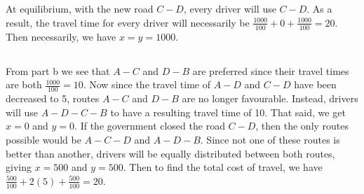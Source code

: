\documentclass[12pt]{article}
\begin{document}
\subsection{}
At equilibrium, with the new road $C-D$, every driver will use $C-D$. As a result, the travel time for every driver will necessarily be $\frac{1000}{100} + 0 + \frac{1000}{100} = 20.$ Then necessarily, we have $x = y = 1000$.
\subsection{}
From part b we see that $A-C$ and $D-B$ are preferred since their travel times are both $\frac{1000}{100} = 10$. Now since the travel time of $A-D$ and $C-D$ have been decreased to 5, routes $A-C$ and $D-B$ are no longer favourable. Instead, drivers will use $A-D-C-B$ to have a resulting travel time of 10. That said, we get $x = 0$ and $y = 0$. If the government closed the road $C-D$, then the only routes possible would be $A-C-D$ and $A-D-B$. Since not one of these routes is better than another, drivers will be equally distributed between both routes, giving $x = 500$ and $y = 500$. Then to find the total cost of travel, we have $\frac{500}{100} + 2(5) + \frac{500}{100} = 20$. 
\end{document}

